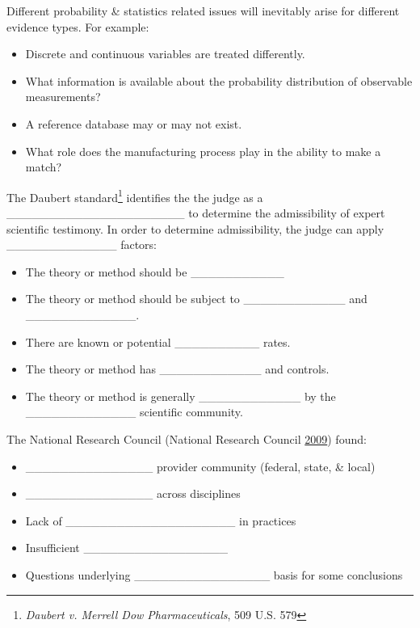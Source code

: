 \documentclass[]{book}
\providecommand{\tightlist}{%
  \setlength{\itemsep}{0pt}\setlength{\parskip}{0pt}}
\let\rmarkdownfootnote\footnote%
\def\footnote{\protect\rmarkdownfootnote}
\theoremstyle{definition}
\theoremstyle{definition}
\theoremstyle{remark}
\begin{document}
Different probability \& statistics related issues will inevitably arise
for different evidence types. For example:

\begin{itemize}
\tightlist
\item
  Discrete and continuous variables are treated differently.
\item
  What information is available about the probability distribution of
  observable measurements?
\item
  A reference database may or may not exist.
\item
  What role does the manufacturing process play in the ability to make a
  match?
\end{itemize}

The Daubert standard\footnote{\emph{Daubert v. Merrell Dow
  Pharmaceuticals}, 509 U.S. 579} identifies the the judge as a
\_\_\_\_\_\_\_\_\_\_\_\_\_\_\_\_\_\_\_\_\_ to determine the
admissibility of expert scientific testimony. In order to determine
admissibility, the judge can apply \_\_\_\_\_\_\_\_\_\_\_\_\_ factors:
\vspace{.1in}

\begin{itemize}
\tightlist
\item
  The theory or method should be \_\_\_\_\_\_\_\_\_\_\_ \vspace{.1in}
\item
  The theory or method should be subject to \_\_\_\_\_\_\_\_\_\_\_\_ and
  \_\_\_\_\_\_\_\_\_\_\_\_\_. \vspace{.1in}
\item
  There are known or potential \_\_\_\_\_\_\_\_\_\_ rates.\vspace{.1in}
\item
  The theory or method has \_\_\_\_\_\_\_\_\_\_\_\_ and
  controls.\vspace{.1in}
\item
  The theory or method is generally \_\_\_\_\_\_\_\_\_\_\_\_ by the
  \_\_\_\_\_\_\_\_\_\_\_\_\_ scientific community.
\end{itemize}

The National Research Council (National Research Council
\protect\hyperlink{ref-nrc09}{2009}) found:\vspace{.1in}

\begin{itemize}
\tightlist
\item
  \_\_\_\_\_\_\_\_\_\_\_\_\_\_\_ provider community (federal, state, \&
  local) \vspace{.1in}
\item
  \_\_\_\_\_\_\_\_\_\_\_\_\_\_\_ across disciplines \vspace{.1in}
\item
  Lack of \_\_\_\_\_\_\_\_\_\_\_\_\_\_\_\_\_\_\_\_ in practices
  \vspace{.1in}
\item
  Insufficient \_\_\_\_\_\_\_\_\_\_\_\_\_\_\_\_\_ \vspace{.1in}
\item
  Questions underlying \_\_\_\_\_\_\_\_\_\_\_\_\_\_\_\_ basis for some
  conclusions
\end{itemize}
\end{document}
